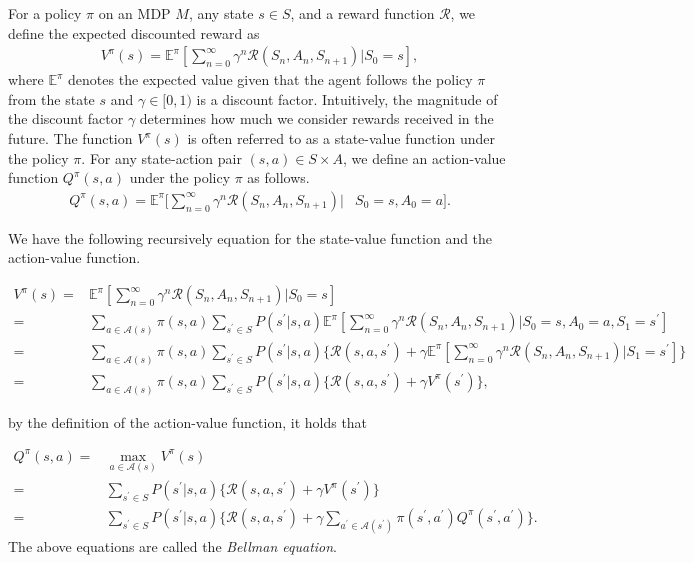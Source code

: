 \documentclass[a4j,12pt,oneside,openany,english,dvipdfmx]{jsbook}
\begin{document}
\begin{definition}
  For a policy $\pi$ on an MDP $M$, any state $s \in S$, and a reward function $\mathcal{R}$, we define the expected discounted reward as
  \begin{align*}
    V^{\pi}(s)= \mathbb{E}^{\pi}[\sum_{n=0}^{\infty}\gamma^n \mathcal{R}(S_n, A_n, S_{n+1})|S_0 = s],
  \end{align*}
where $\mathbb{E}^{\pi}$ denotes the expected value given that the agent follows the policy $\pi$ from the state $s$ and $\gamma \in [0,1)$ is a discount factor. Intuitively, the magnitude of the discount factor $\gamma$ determines how much we consider rewards received in the future. The function $V^{\pi}(s)$ is often referred to as a state-value function under the policy $\pi$. For any state-action pair $(s,a) \in S \times A$, we define an action-value function $Q^{\pi}(s,a)$ under the policy $\pi$ as follows.
  \begin{align*}
    Q^{\pi}(s,a)= \mathbb{E}^{\pi}[\sum_{n=0}^{\infty}\gamma^n \mathcal{R}(S_n, A_n, S_{n+1})|&S_0 = s, A_0 = a].
  \end{align*}

  We have the following recursively equation for the state-value function and the action-value function.

  \begin{align*}
    V^{\pi}(s) = & \mathbb{E}^{\pi}[\sum_{n=0}^{\infty}\gamma^n \mathcal{R}(S_n, A_n, S_{n+1})|S_0 = s] \\
     = & \sum_{a \in \mathcal{A}(s)} \pi(s,a) \sum_{s^{\prime} \in S} P(s^{\prime}|s,a) \mathbb{E}^{\pi}[\sum_{n=0}^{\infty}\gamma^n \mathcal{R}(S_n, A_n, S_{n+1})|S_0 = s, A_0 = a, S_1 = s^{\prime}] \\
     = & \sum_{a \in \mathcal{A}(s)} \pi(s,a) \sum_{s^{\prime} \in S} P(s^{\prime}|s,a) \{ \mathcal{R}(s, a, s^{\prime}) + \gamma \mathbb{E}^{\pi}[\sum_{n=0}^{\infty}\gamma^n \mathcal{R}(S_n, A_n, S_{n+1})|S_1 = s^{\prime}] \} \\
    = & \sum_{a \in \mathcal{A}(s)} \pi(s,a) \sum_{s^{\prime} \in S} P(s^{\prime}|s,a) \{ \mathcal{R}(s, a, s^{\prime}) + \gamma V^{\pi}(s^{\prime}) \},
  \end{align*}
\end{definition}

by the definition of the action-value function, it holds that

\begin{align*}
  Q^{\pi}(s,a) = & \max_{a \in \mathcal{A}(s)}V^{\pi}(s) \\
               = & \sum_{s^{\prime} \in S} P(s^{\prime}|s,a) \{ \mathcal{R}(s, a, s^{\prime}) + \gamma V^{\pi}(s^{\prime}) \} \\
               = & \sum_{s^{\prime} \in S} P(s^{\prime}|s,a) \{ \mathcal{R}(s, a, s^{\prime}) + \gamma \sum_{a^{\prime} \in \mathcal{A}(s^{\prime})} \pi(s^{\prime}, a^{\prime}) Q^{\pi}(s^{\prime},a^{\prime}) \}.
\end{align*}
 The above equations are called the {\it Bellman equation}.
\end{document}

